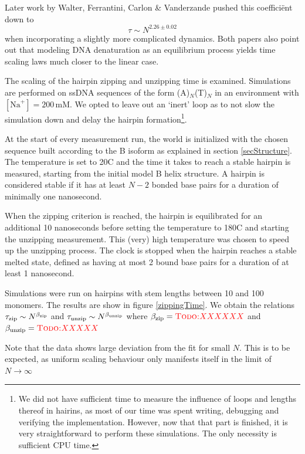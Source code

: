 Later work by Walter, Ferrantini, Carlon \& Vanderzande \cite{walter2011fractional} pushed this coeffici\"ent down to 
\begin{equation}
\tau \sim N^{2.26 \pm 0.02}
\end{equation}
when incorporating a slightly more complicated dynamics.
Both papers also point out that modeling DNA denaturation as an equilibrium process yields time scaling laws much closer to the linear case.


The scaling of the hairpin zipping and unzipping time is examined.
Simulations are performed on ssDNA sequences of the form (A)$_N$(T)$_N$ in an environment with $[\text{Na}^+] = 200$\,mM.
We opted to leave out an `inert' loop as to not slow the simulation down and delay the hairpin formation\footnote{We did not have sufficient time to measure the influence of loops and lengths thereof in hairins, as most of our time was spent writing, debugging and verifying the implementation.
However, now that that part is finished, it is very straightforward to perform these simulations. The only necessity is sufficient CPU time.}. 

At the start of every measurement run, the world is initialized with the chosen sequence built according to the B isoform as explained in section \ref{secStructure}.
The temperature is set to 20{\degree}C and the time it takes to reach a stable hairpin is measured, starting from the initial model B helix structure.
A hairpin is considered stable if it has at least $N-2$ bonded base pairs for a duration of minimally one nanosecond.

When the zipping criterion is reached, the hairpin is equilibrated for an additional 10 nanoseconds before setting the temperature to 180{\degree}C and starting the unzipping measurement.
This (very) high temperature was chosen to speed up the unzipping process.
The clock is stopped when the hairpin reaches a stable melted state, defined as having at most 2 bound base pairs for a duration of at least 1 nanosecond.

Simulations were run on hairpins with stem lengths between 10 and 100 monomers. 
The results are show in figure \ref{zippingTime}. We obtain the relations ${\tau_\text{zip}} \sim N^{\beta_\text{zip}}$ and ${\tau_\text{unzip}} \sim N^{\beta_\text{unzip}}$ where ${\beta_\text{zip}} = \textcolor{red}{\textsc{Todo:} XXXXXX}$ and ${\beta_\text{unzip}} = \textcolor{red}{\textsc{Todo:} XXXXX}$

Note that the data shows large deviation from the fit for small $N$. This is to be expected, as uniform scaling behaviour only manifests itself in the limit of $N \to \infty$


